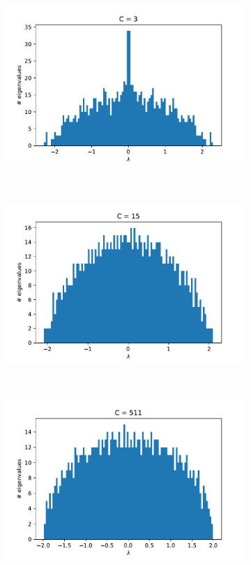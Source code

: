 \documentclass[../main.tex]{subfiles}
\begin{document}
\begin{figure}[htpb]
    \vspace{-3cm}
    \centering
    \begin{subfigure}{\textwidth}
        \centering
        \includegraphics[width=.8\linewidth]{../figures/2_1_4_universality_classes0003.pdf}
        \caption{}
        \label{fig:universality_classes_0003}
    \end{subfigure}\\%
    \begin{subfigure}{\textwidth}
        \centering
        \includegraphics[width=.8\linewidth]{../figures/2_1_4_universality_classes0015.pdf}
        \caption{}
        \label{fig:universality_classes_0015}
    \end{subfigure}\\%
    \begin{subfigure}{\textwidth}
        \centering
        \includegraphics[width=.8\linewidth]{../figures/2_1_4_universality_classes0511.pdf}

\end{subfigure}
\end{figure}
\end{document}
